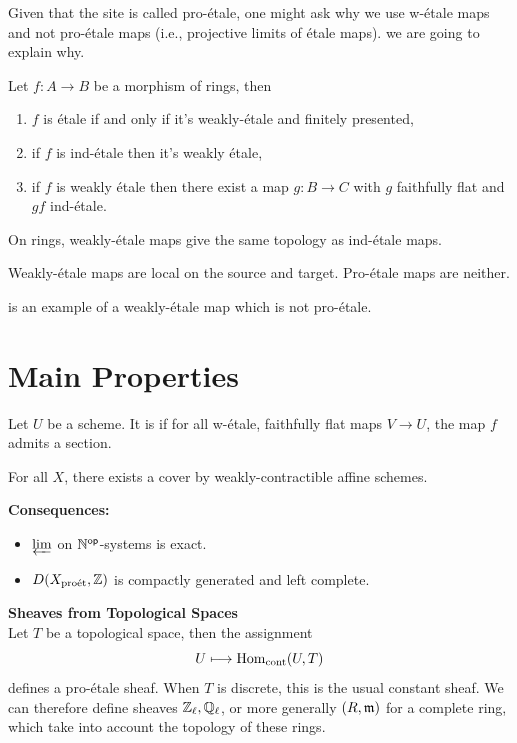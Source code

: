 \documentclass[oneside]{amsart}
\begin{document}
Given that the site is called pro-étale, one might ask why we use w-étale maps and not
pro-étale maps (i.e., projective limits of étale maps). we are going to explain why.
\begin{theorem}[{\cite[Theorem 1.3]{BS}}]
	Let $f:A\to B$ be a morphism of rings, then
	\begin{enumerate}[(1)]
		\item $f$ is \'etale if and only if it's weakly-\'etale and finitely presented,
		\item if $f$ is ind-\'etale then it's weakly \'etale,
		\item if $f$ is weakly \'etale then there exist a map $g:B\to C$ with $g$ faithfully
			flat and $gf$ ind-\'etale.
	\end{enumerate}
\end{theorem}
\begin{corollary}
	On rings, weakly-\'etale maps give the same topology as ind-\'etale maps.
\end{corollary}
\begin{proposition}
	Weakly-\'etale maps are local on the source and target. Pro-\'etale maps are neither.
\end{proposition}
\cite[Example 4.1.12]{BS} is an example of a weakly-\'etale map which is not pro-\'etale.

\section{Main Properties}
\begin{definition}
	Let $U$ be a scheme. It is  if for all w-\'etale, faithfully
	flat maps $V\to U$, the map $f$ admits a section.
\end{definition}
\begin{theorem}[{\cite[Theorem 1.5]{BS}}]
	For all $X$, there exists a cover by weakly-contractible affine schemes.
\end{theorem}
\textbf{Consequences:}
\begin{itemize}
	\item $\varprojlim $ on $\mathbb N^\mathsf{op}$-systems is exact.
	\item $D(X_{\mathrm{pro\acute{e}t}},\mathbb Z)$ is compactly generated and left complete.
\end{itemize}

\textbf{Sheaves from Topological Spaces}\label{top_sh}\\
Let $T$ be a topological space, then the assignment
\[
	U \mapsto \Hom\cont(U,T)
\]
defines a pro-\'etale sheaf. When $T$ is discrete, this is the usual constant sheaf. We
can therefore define sheaves $\mathbb Z_\ell, \mathbb Q_\ell$, or more generally $(R,\mathfrak{m})$ for a
complete ring, which take into account the topology of these rings.
\end{document}
